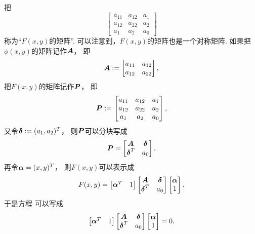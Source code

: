 把\begin{equation}
	\begin{bmatrix}
		a_{11} & a_{12} & a_1 \\
		a_{12} & a_{22} & a_2 \\
		a_1 & a_2 & a_0
	\end{bmatrix}
\end{equation}
称为“\(F(x,y)\)的矩阵”.
可以注意到，\(F(x,y)\)的矩阵也是一个对称矩阵.
如果把\(\phi(x,y)\)的矩阵记作\(\boldsymbol{A}\)，
即\begin{equation*}
	\boldsymbol{A} := \begin{bmatrix}
		a_{11} & a_{12} \\
		a_{12} & a_{22}
	\end{bmatrix},
\end{equation*}
把\(F(x,y)\)的矩阵记作\(\boldsymbol{P}\)，
即\begin{equation*}
	\boldsymbol{P} := \begin{bmatrix}
		a_{11} & a_{12} & a_1 \\
		a_{12} & a_{22} & a_2 \\
		a_1 & a_2 & a_0
	\end{bmatrix},
\end{equation*}
又令\(\boldsymbol\delta := (a_1,a_2)^T\)，
则\(\boldsymbol{P}\)可以分块写成\begin{equation*}
	\boldsymbol{P}
	= \begin{bmatrix}
		\boldsymbol{A} & \boldsymbol\delta \\
		\boldsymbol\delta^T & a_0
	\end{bmatrix}.
\end{equation*}
再令\(\boldsymbol\alpha = (x,y)^T\)，
则\(F(x,y)\)可以表示成\begin{equation*}
	F(x,y)
	= \begin{bmatrix}
		\boldsymbol\alpha^T & 1
	\end{bmatrix}
	\begin{bmatrix}
		\boldsymbol{A} & \boldsymbol\delta \\
		\boldsymbol\delta^T & a_0
	\end{bmatrix}
	\begin{bmatrix}
		\boldsymbol\alpha \\ 1
	\end{bmatrix}.
\end{equation*}
于是方程  可以写成
\begin{equation}\label{equation:二次曲线方程.平面二次曲线的一般方程.矩阵形式}
	\begin{bmatrix}
		\boldsymbol\alpha^T & 1
	\end{bmatrix}
	\begin{bmatrix}
		\boldsymbol{A} & \boldsymbol\delta \\
		\boldsymbol\delta^T & a_0
	\end{bmatrix}
	\begin{bmatrix}
		\boldsymbol\alpha \\ 1
	\end{bmatrix}
	= 0.
\end{equation}
\endgroup

